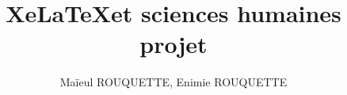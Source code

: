 \documentclass[a4paper,11pt]{book}
\begin{document}
\title{Xe\LaTeX et sciences humaines \\ projet}
\author{Maïeul ROUQUETTE, Enimie ROUQUETTE}
\date{}
%
%
%



\end{document}
